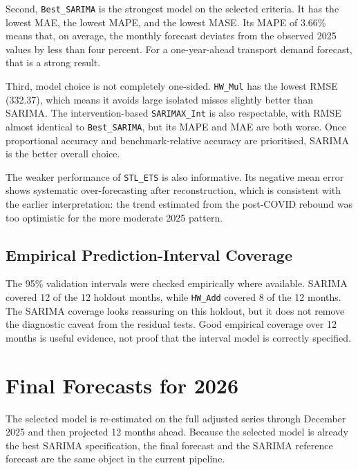 \documentclass[runningheads]{llncs}
\begin{document}
Second, \texttt{Best\_SARIMA} is the strongest model on the selected criteria. It has the lowest MAE, the lowest MAPE, and the lowest MASE. Its MAPE of 3.66\% means that, on average, the monthly forecast deviates from the observed 2025 values by less than four percent. For a one-year-ahead transport demand forecast, that is a strong result.

Third, model choice is not completely one-sided. \texttt{HW\_Mul} has the lowest RMSE (332.37), which means it avoids large isolated misses slightly better than SARIMA. The intervention-based \texttt{SARIMAX\_Int} is also respectable, with RMSE almost identical to \texttt{Best\_SARIMA}, but its MAPE and MAE are both worse. Once proportional accuracy and benchmark-relative accuracy are prioritised, SARIMA is the better overall choice.

The weaker performance of \texttt{STL\_ETS} is also informative. Its negative mean error shows systematic over-forecasting after reconstruction, which is consistent with the earlier interpretation: the trend estimated from the post-COVID rebound was too optimistic for the more moderate 2025 pattern.

\subsection{Empirical Prediction-Interval Coverage}
The 95\% validation intervals were checked empirically where available. SARIMA covered 12 of the 12 holdout months, while \texttt{HW\_Add} covered 8 of the 12 months. The SARIMA coverage looks reassuring on this holdout, but it does not remove the diagnostic caveat from the residual tests. Good empirical coverage over 12 months is useful evidence, not proof that the interval model is correctly specified.

\section{Final Forecasts for 2026}
The selected model is re-estimated on the full adjusted series through December 2025 and then projected 12 months ahead. Because the selected model is already the best SARIMA specification, the final forecast and the SARIMA reference forecast are the same object in the current pipeline.
\end{document}

